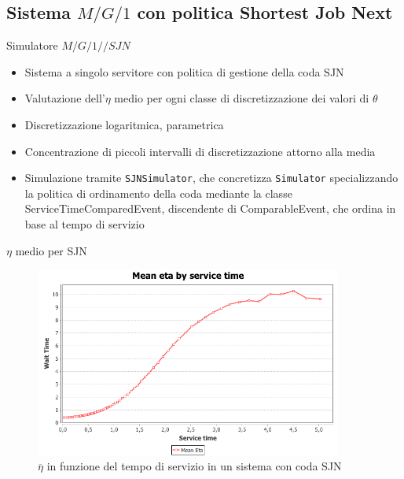 \documentclass[slidestop,compress,mathserif]{beamer}
\begin{document}
\subsection{Sistema $M/G/1$ con politica Shortest Job Next}
\begin{frame}{Simulatore  $M/G/1//SJN$}
\vfill
\begin{itemize}
	\item Sistema a singolo servitore con politica di gestione della coda SJN
	\item Valutazione dell'$\eta$ medio per ogni classe di discretizzazione dei valori di $\theta$
	\item Discretizzazione logaritmica, parametrica
	\item Concentrazione di piccoli intervalli di discretizzazione attorno alla media
	\item Simulazione tramite {\tt SJNSimulator}, che concretizza {\tt Simulator} specializzando la politica di ordinamento della coda mediante la classe ServiceTimeComparedEvent, discendente di ComparableEvent, che ordina in base al tempo di servizio
\end{itemize}
\vfill
\end{frame}

\begin{frame}{$\eta$ medio per SJN}
\begin{figure}[!h]{
	\begin{center}
	   \includegraphics[width=0.9\textwidth]{figures/MG1SJN[rho_08,mu_05,runs_1000,arrivals_100000,steps_30,mult_10].png}
	\end{center}}
	\caption{\footnotesize $\overline{\eta}$ in funzione del tempo di servizio in un sistema con coda SJN}
	\label{fig:random}
\end{figure}
\normalsize
\end{frame}
\end{document}
